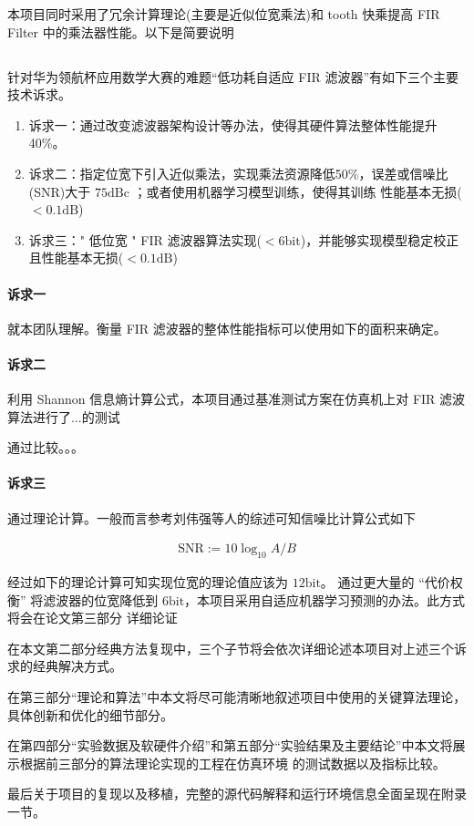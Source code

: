 本项目同时采用了冗余计算理论(主要是近似位宽乘法)和 tooth 快乘提高 FIR Filter 中的乘法器性能。以下是简要说明

\subsection{}

针对华为领航杯应用数学大赛的难题``低功耗自适应 FIR 滤波器''有如下三个主要技术诉求。

\begin{enumerate}
    \item 诉求一：通过改变滤波器架构设计等办法，使得其硬件算法整体性能提升40\%。
    \item 诉求二：指定位宽下引入近似乘法，实现乘法资源降低50\%，误差或信噪比(SNR)大于 $75 \mathrm{dBc}$
            ；或者使用机器学习模型训练，使得其训练
            性能基本无损($< 0.1 \mathrm{dB}$)
    \item 诉求三：" 低位宽 " FIR 滤波器算法实现($< 6 \mathrm{bit}$)，并能够实现模型稳定校正且性能基本无损($< 0.1 \mathrm{dB}$)
\end{enumerate}

\paragraph{诉求一}

就本团队理解。衡量 FIR 滤波器的整体性能指标可以使用如下的面积来确定。

\paragraph{诉求二}

利用 Shannon 信息熵计算公式，本项目通过基准测试方案在仿真机上对 FIR 滤波算法进行了...的测试

通过比较。。。


\paragraph{诉求三}

通过理论计算。一般而言参考刘伟强等人的综述可知信噪比计算公式如下

\begin{eqnarray*}
    \mathrm{SNR} := 10 \log_{10} A/B
\end{eqnarray*}

经过如下的理论计算可知实现位宽的理论值应该为 $12 \mathrm{bit}$。
通过更大量的 ``代价权衡'' 将滤波器的位宽降低到 $6 \mathrm{bit}$，本项目采用自适应机器学习预测的办法。此方式将会在论文第三部分
详细论证


在本文第二部分经典方法复现中，三个子节将会依次详细论述本项目对上述三个诉求的经典解决方式。

在第三部分``理论和算法''中本文将尽可能清晰地叙述项目中使用的关键算法理论，具体创新和优化的细节部分。

在第四部分``实验数据及软硬件介绍''和第五部分``实验结果及主要结论''中本文将展示根据前三部分的算法理论实现的工程在仿真环境
的测试数据以及指标比较。

最后关于项目的复现以及移植，完整的源代码解释和运行环境信息全面呈现在附录一节。

